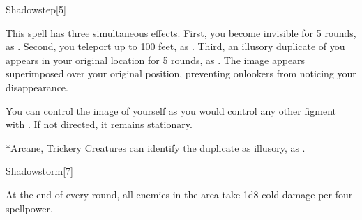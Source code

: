 \begin{spellsection}{Shadowstep}[5]
    \begin{spellheader}
    \end{spellheader}
    \begin{spellcontent}
        \begin{spelltargetinginfo}
        \end{spelltargetinginfo}
        \begin{spelleffects}
            \spelleffect This spell has three simultaneous effects.
            First, you become invisible for 5 rounds, as .
            Second, you teleport up to 100 feet, as .
            Third, an illusory duplicate of you appears in your original location for 5 rounds, as .
            The image appears superimposed over your original position, preventing onlookers from noticing your disappearance.

            You can control the image of yourself as you would control any other figment with . If not directed, it remains stationary.
        \end{spelleffects}
    \end{spellcontent}
    \begin{spellfooter}
        *{Arcane, Trickery}
        \spellnotes Creatures can identify the duplicate as illusory, as .
        \miscastexplode
    \end{spellfooter}
\end{spellsection}

\begin{spellsection}{Shadowstorm}[7]
    \begin{spellheader}
    \end{spellheader}
    \begin{spellcontent}
        \begin{spelltargetinginfo}
        \end{spelltargetinginfo}
        \begin{spelleffects}
            \spelleffect At the end of every round, all enemies in the area take 1d8 cold damage per four spellpower.
        \end{spelleffects}
    \end{spellcontent}
    \begin{spellfooter}
        \miscastexplode
    \end{spellfooter}
\end{spellsection}

